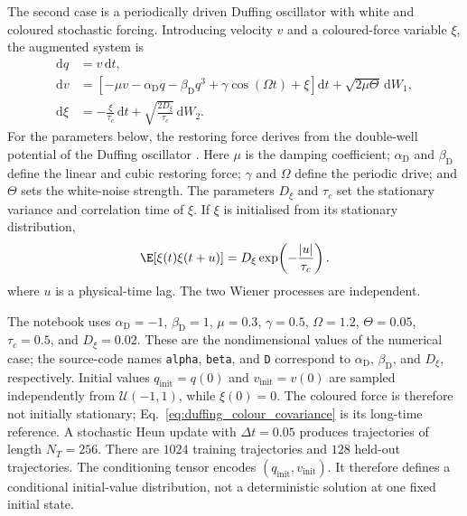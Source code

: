 The second case is a periodically driven Duffing oscillator with white and
coloured stochastic forcing. Introducing velocity $v$ and a coloured-force
variable $\xi$, the augmented system is
\begin{align}
    \mathrm{d}q
    &= v\,\mathrm{d}t,
    \label{eq:duffing_q}\\
    \mathrm{d}v
    &=
    \left[-\mu v-\alpha_{\mathrm{D}} q-\beta_{\mathrm{D}} q^3
    +\gamma\cos(\Omega t)+\xi\right]
    \mathrm{d}t
    +\sqrt{2\mu\Theta}\,\mathrm{d}W_1,
    \label{eq:duffing_v}\\
    \mathrm{d}\xi
    &=
    -\frac{\xi}{\tau_c}\,\mathrm{d}t
    +\sqrt{\frac{2D_\xi}{\tau_c}}\,\mathrm{d}W_2 .
    \label{eq:duffing_colour}
\end{align}
For the parameters below, the restoring force derives from the double-well
potential of the Duffing oscillator \cite{guckenheimer1983nonlinear}. Here $\mu$ is the damping
coefficient; $\alpha_{\mathrm{D}}$ and $\beta_{\mathrm{D}}$ define the linear and
cubic restoring force; $\gamma$ and $\Omega$ define the periodic drive; and $\Theta$ sets the
white-noise strength. The parameters $D_\xi$ and $\tau_c$ set the stationary
variance and correlation time of $\xi$. If $\xi$ is initialised from its
stationary distribution,
\begin{equation}
    \E[\xi(t)\xi(t+u)]
    =
    D_\xi\exp\!\left(-\frac{\lvert u\rvert}{\tau_c}\right).
    \label{eq:duffing_colour_covariance}
\end{equation}
where $u$ is a physical-time lag. The two Wiener processes are independent.

The notebook uses $\alpha_{\mathrm{D}}=-1$, $\beta_{\mathrm{D}}=1$, $\mu=0.3$, $\gamma=0.5$,
$\Omega=1.2$, $\Theta=0.05$, $\tau_c=0.5$, and $D_\xi=0.02$. These are the
nondimensional values of the numerical case; the source-code names
\texttt{alpha}, \texttt{beta}, and \texttt{D} correspond to
$\alpha_{\mathrm{D}}$, $\beta_{\mathrm{D}}$, and $D_\xi$, respectively. Initial values
$q_{\mathrm{init}}=q(0)$ and $v_{\mathrm{init}}=v(0)$ are sampled independently
from $\mathcal{U}(-1,1)$, while $\xi(0)=0$. The coloured force is therefore not
initially stationary; Eq.~\eqref{eq:duffing_colour_covariance} is its long-time
reference. A stochastic Heun update with $\Delta t=0.05$ produces trajectories
of length $N_T=256$. There are $1024$
training trajectories and $128$ held-out trajectories. The conditioning tensor
encodes $(q_{\mathrm{init}},v_{\mathrm{init}})$. It therefore defines a
conditional initial-value distribution, not a deterministic solution at one fixed
initial state.


